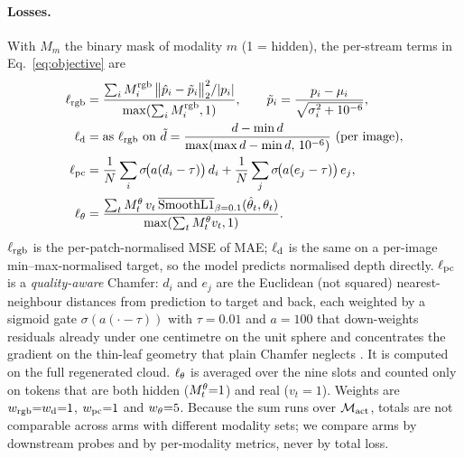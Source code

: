 \paragraph{Losses.}
With $M_m$ the binary mask of modality $m$ (1 = hidden), the per-stream terms in
Eq.~\eqref{eq:objective} are
\begin{align}
  \ell_{\mathrm{rgb}} &= \frac{\sum_i M^{\mathrm{rgb}}_i\,\big\|\hat{p}_i-\tilde{p}_i\big\|_2^2/|p_i|}{\max(\sum_i M^{\mathrm{rgb}}_i,1)},
  \qquad \tilde{p}_i=\frac{p_i-\mu_i}{\sqrt{\sigma_i^2+10^{-6}}}, \\
  \ell_{\mathrm{d}} &= \text{as }\ell_{\mathrm{rgb}}\text{ on } \tilde{d}=\frac{d-\min d}{\max(\max d-\min d,\,10^{-6})}
  \ \text{(per image)}, \\
  \ell_{\mathrm{pc}} &= \frac1N\sum_{i}\sigma\!\big(a(d_i-\tau)\big)\,d_i
             + \frac1N\sum_{j}\sigma\!\big(a(e_j-\tau)\big)\,e_j,
  \label{eq:qal} \\
  \ell_{\theta} &= \frac{\sum_t M^{\theta}_t\,v_t\,\overline{\mathrm{SmoothL1}}_{\beta=0.1}(\hat{\theta}_t,\theta_t)}{\max(\sum_t M^{\theta}_t v_t,1)} .
\end{align}
$\ell_{\mathrm{rgb}}$ is the per-patch-normalised MSE of MAE; $\ell_{\mathrm{d}}$ is the same on a
per-image min--max-normalised target, so the model predicts normalised depth
directly. $\ell_{\mathrm{pc}}$ is a \emph{quality-aware} Chamfer: $d_i$ and $e_j$ are the
Euclidean (not squared) nearest-neighbour distances from prediction to target and
back, each weighted by a sigmoid gate $\sigma(a(\cdot-\tau))$ with $\tau{=}0.01$ and
$a{=}100$ that down-weights residuals already under one centimetre on the unit
sphere and concentrates the gradient on the thin-leaf geometry that plain Chamfer
neglects . It is computed on the full regenerated cloud.
$\ell_{\theta}$ is averaged over the nine slots and counted only on tokens that are
both hidden ($M^{\theta}_t{=}1$) and real ($v_t{=}1$). Weights are
$w_{\mathrm{rgb}}{=}w_{\mathrm{d}}{=}1$, $w_{\mathrm{pc}}{=}1$ and $w_{\theta}{=}5$. Because the sum runs over
$\mathcal{M}_{\mathrm{act}}$, totals are not comparable across arms with different
modality sets; we compare arms by downstream probes and by per-modality metrics,
never by total loss.

